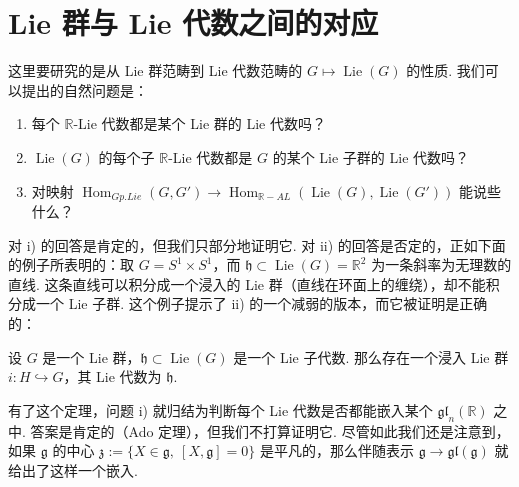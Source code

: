 \section{Lie 群与 Lie 代数之间的对应}\label{sec:lie-1-9}

这里要研究的是从 Lie 群范畴到 Lie 代数范畴的 $G\mapsto\operatorname{Lie}(G)$ 的性质. 我们可以提出的自然问题是：
\begin{enumerate}[label=\roman*)]
\item 每个 $\mathbb R$-Lie 代数都是某个 Lie 群的 Lie 代数吗？
\item $\operatorname{Lie}(G)$ 的每个子 $\mathbb R$-Lie 代数都是 $G$ 的某个 Lie 子群的 Lie 代数吗？
\item 对映射 $\operatorname{Hom}_{Gp.Lie}(G,G')\longrightarrow\operatorname{Hom}_{\mathbb R-AL}(\operatorname{Lie}(G),\operatorname{Lie}(G'))$ 能说些什么？
\end{enumerate}
对 i) 的回答是肯定的，但我们只部分地证明它. 对 ii) 的回答是否定的，正如下面的例子所表明的：取 $G=S^{1}\times S^{1}$，而 $\mathfrak h\subset\operatorname{Lie}(G)=\mathbb R^{2}$ 为一条斜率为无理数的直线. 这条直线可以积分成一个浸入的 Lie 群（直线在环面上的缠绕），却不能积分成一个 Lie 子群. 这个例子提示了 ii) 的一个减弱的版本，而它被证明是正确的：

\begin{theorem}\label{thm:lie-1-9-1}
设 $G$ 是一个 Lie 群，$\mathfrak h\subset\operatorname{Lie}(G)$ 是一个 Lie 子代数. 那么存在一个浸入 Lie 群 $i:H\hookrightarrow G$，其 Lie 代数为 $\mathfrak h$.
\end{theorem}

\begin{remark*}
有了这个定理，问题 i) 就归结为判断每个 Lie 代数是否都能嵌入某个 $\mathfrak{gl}_{n}(\mathbb R)$ 之中. 答案是肯定的（Ado 定理），但我们不打算证明它. 尽管如此我们还是注意到，如果 $\mathfrak g$ 的中心 $\mathfrak z:=\{X\in\mathfrak g,\ [X,\mathfrak g]=0\}$ 是平凡的，那么伴随表示 $\mathfrak g\longrightarrow\mathfrak{gl}(\mathfrak g)$ 就给出了这样一个嵌入.
\end{remark*}

